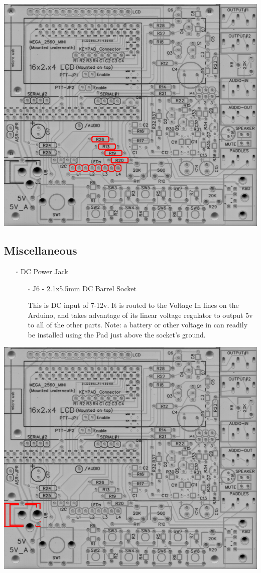\documentclass[11pt]{article}
\begin{document}
\begin{center}
\includegraphics[width=.9\linewidth]{../png/3.4/pcb-top-led-indicators.png}
\end{center}

\newpage
\subsection{Miscellaneous}
\label{sec:org538c13a}
\begin{itemize}
\item[{$\square$}] DC Power Jack
\begin{itemize}
\item[{$\square$}] J6 - 2.1x5.5mm DC Barrel Socket

This is DC input of 7-12v.  It is routed to the Voltage In lines on the Arduino, and takes advantage of its linear voltage regulator to output 5v to all of the other parts.  Note:  a battery or other voltage in can readily be installed using the Pad just above the socket's ground.
\end{itemize}
\end{itemize}
\begin{center}
\includegraphics[width=.9\linewidth]{../png/3.5/pcb-top-dc-power-jack.png}
\end{center}
\end{document}
